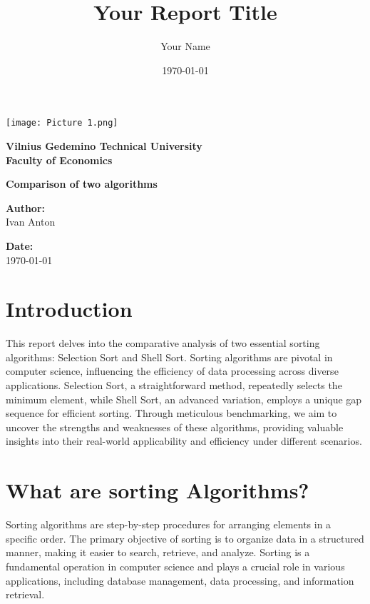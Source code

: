 \documentclass{article}
\title{Your Report Title}
\author{Your Name}
\date{\today} %
\begin{document}
\begin{titlepage}
    \centering
    \vspace*{1cm}

    \texttt{[image: Picture 1.png]} 
    \vspace{1cm}
    
    \LARGE
    \textbf{Vilnius Gedemino Technical University} \\
    \textbf{Faculty of Economics} \\
    \vspace{1.5cm}

    \Huge
    \textbf{Comparison of two algorithms} \\
    \vspace{2cm}

    \Large
    \textbf{Author:} \\
    Ivan Anton\\
    \vspace{1cm}

    \large
    \textbf{Date:} \\
    \today %

\end{titlepage}

\tableofcontents

\newpage

\section{Introduction}
This report delves into the comparative analysis of two essential sorting algorithms: Selection Sort and Shell Sort. Sorting algorithms are pivotal in computer science, influencing the efficiency of data processing across diverse applications. Selection Sort, a straightforward method, repeatedly selects the minimum element, while Shell Sort, an advanced variation, employs a unique gap sequence for efficient sorting. Through meticulous benchmarking, we aim to uncover the strengths and weaknesses of these algorithms, providing valuable insights into their real-world applicability and efficiency under different scenarios.

\vspace{1.5cm}

\section{What are sorting Algorithms?}

Sorting algorithms are step-by-step procedures for arranging elements in a specific order. The primary objective of sorting is to organize data in a structured manner, making it easier to search, retrieve, and analyze. Sorting is a fundamental operation in computer science and plays a crucial role in various applications, including database management, data processing, and information retrieval.
\end{document}
